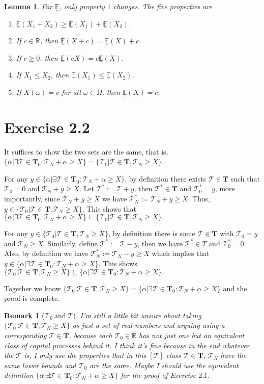\documentclass{article}
\def\sE{\underline{\mathbb{E}}}
\def\t{\mathcal{T}}
\def\T{\mathbf{T}}
\newtheorem{lemma}{Lemma}
\newtheorem{remark}{Remark}
\begin{document}
\begin{lemma}
For $\sE$, only property $1$ changes. The five properties are
\begin{enumerate}
        \item  $\sE(X_1 + X_2) \geq \sE(X_1) + \sE(X_2)$.
    \item  If $c \in \mathbb{R}$, then $\sE(X+c) = \sE(X) + c$.
    \item  If $c \geq 0$, then $\sE(cX) = c\sE(X)$.
    \item  If $X_1 \leq X_2$, then $\sE(X_1) \leq \sE(X_2)$.
    \item  If $X(\omega) = c$ for all $\omega \in \Omega$, then $\sE(X) = c$.
\end{enumerate}
\end{lemma}

\section*{Exercise 2.2}
It suffices to show the two sets are the same, that is, $\{\alpha | \exists \t \in \T_0: \t_N + \alpha \geq X\} =  \{\t_0 | \t \in \T, \t_N \geq X\} $.

For any $y \in \{\alpha | \exists \t \in \T_0: \t_N + \alpha \geq X\}$, by definition there exists $\t \in \T$ such that $\t_0 = 0$ and $\t_N + y \geq X$. Let $\t^* := \t + y$, then $\t^* \in \T$ and $\t^*_0 = y$, more importantly, since $\t_N + y \geq X$ we have $\t^*_N := \t_N + y \geq X$. Thus, $y \in \{\t_0 | \t \in \T, \t_N \geq X\}$. This shows that  $\{\alpha | \exists \t \in \T_0: \t_N + \alpha \geq X\} \subseteq \{\t_0 | \t \in \T, \t_N \geq X\}.$

For any $y \in  \{\t_0 | \t \in \T, \t_N \geq X\}$, by definition there is some $\t \in \T$ with $\t_0 = y$ and $\t_N \geq X$. Similarly, define $\t^* := \t - y$, then we have $\t^* \in T$ and $\t^*_0 = 0$. Also, by definition we have $\t^*_N := \t_N -y \geq X$ which implies that $y \in \{\alpha | \exists \t \in \T_0: \t_N + \alpha \geq X\}$. This shows $ \{\t_0 | \t \in \T, \t_N \geq X\} \subseteq\{\alpha | \exists \t \in \T_0: \t_N + \alpha \geq X\} .$

Together we know $ \{\t_0 | \t \in \T, \t_N \geq X\} = \{\alpha | \exists \t \in \T_0: \t_N + \alpha \geq X\}$ and the proof is complete. 

\begin{remark}[$\t_0 \ \text{and}\  \t$]
I'm still a little bit unsure about taking $\{\t_0 | \t \in \T, \t_N \geq X\}$ as just a set of real numbers and arguing using a corresponding $\t \in \T$, because each $\t_0 \in \mathbb{R}$ has not just one but an equivalent class of capital processes behind it. I think it's fine because in the end whatever the $\t$ is, I only use the properties that in this $[\t]$ class $\t \in \T$, $\t_N$ have the same lower bounds and $\t_0$ are the same. Maybe I should use the equivalent definition $\{\alpha | \exists \t \in \T_0: \t_N + \alpha \geq X\}$ for the proof of Exercise $2.1$.  
\end{remark}
\end{document}
